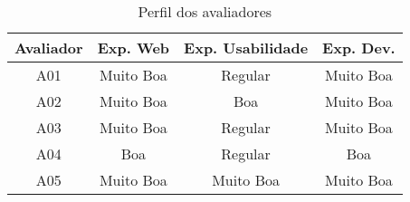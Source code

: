 \begin{table}[h!]
    \centering
    \begin{tabular}{|c|c|c|c|}
        \hline
        \textbf{Avaliador} & \textbf{Exp. Web} & \textbf{Exp. Usabilidade} & \textbf{Exp. Dev.} \\
        \hline
        A01 & Muito Boa & Regular & Muito Boa \\
        \hline
        A02 & Muito Boa & Boa & Muito Boa \\
        \hline
        A03 & Muito Boa & Regular & Muito Boa \\
        \hline
        A04 & Boa & Regular & Boa \\
        \hline
        A05 & Muito Boa & Muito Boa & Muito Boa \\
        \hline
    \end{tabular}
    \caption{Perfil dos avaliadores}
    \label{tab:perfil-avaliadores}
\end{table}